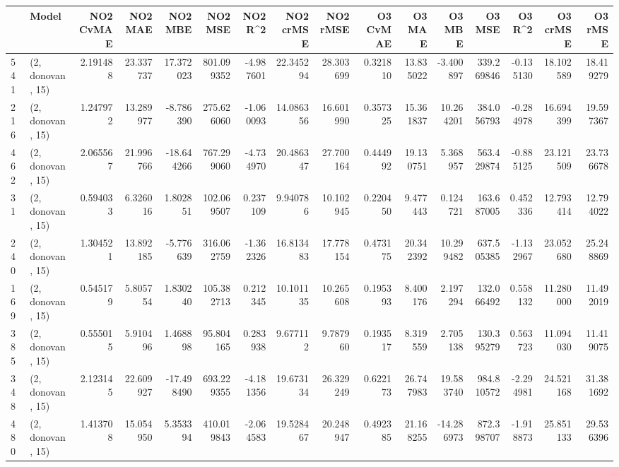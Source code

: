 \begin{tabular}{llrrrrrrrrrrrrrr}
\toprule
{} &             Model &  NO2 CvMAE &    NO2 MAE &    NO2 MBE &      NO2 MSE &    NO2 R\textasciicircum2 &  NO2 crMSE &   NO2 rMSE &  O3 CvMAE &     O3 MAE &     O3 MBE &        O3 MSE &     O3 R\textasciicircum2 &   O3 crMSE &     O3 rMSE \\
\midrule
541 &  (2, donovan, 15) &   2.191488 &  23.337737 &  17.372023 &   801.099352 &  -4.987601 &  22.345294 &  28.303699 &  0.321810 &  13.835022 &  -3.400897 &    339.269846 &  -0.135130 &  18.102589 &   18.419279 \\
216 &  (2, donovan, 15) &   1.247972 &  13.289977 &  -8.786390 &   275.626060 &  -1.060093 &  14.086356 &  16.601990 &  0.357325 &  15.361837 &  10.264201 &    384.056793 &  -0.284978 &  16.694399 &   19.597367 \\
462 &  (2, donovan, 15) &   2.065567 &  21.996766 & -18.644266 &   767.299060 &  -4.734970 &  20.486347 &  27.700164 &  0.444992 &  19.130751 &   5.368957 &    563.429874 &  -0.885125 &  23.121509 &   23.736678 \\
31  &  (2, donovan, 15) &   0.594033 &   6.326016 &   1.802851 &   102.069507 &   0.237109 &   9.940786 &  10.102945 &  0.220450 &   9.477443 &   0.124721 &    163.687005 &   0.452336 &  12.793414 &   12.794022 \\
240 &  (2, donovan, 15) &   1.304521 &  13.892185 &  -5.776639 &   316.062759 &  -1.362326 &  16.813483 &  17.778154 &  0.473175 &  20.342392 &  10.299482 &    637.505385 &  -1.132967 &  23.052680 &   25.248869 \\
169 &  (2, donovan, 15) &   0.545179 &   5.805754 &   1.830240 &   105.382713 &   0.212345 &  10.101135 &  10.265608 &  0.195393 &   8.400176 &   2.197294 &    132.066492 &   0.558132 &  11.280000 &   11.492019 \\
385 &  (2, donovan, 15) &   0.555015 &   5.910496 &   1.468898 &    95.804165 &   0.283938 &   9.677112 &   9.787960 &  0.193517 &   8.319559 &   2.705138 &    130.395279 &   0.563723 &  11.094030 &   11.419075 \\
348 &  (2, donovan, 15) &   2.123145 &  22.609927 & -17.498490 &   693.229355 &  -4.181356 &  19.673134 &  26.329249 &  0.622173 &  26.747983 &  19.583740 &    984.810572 &  -2.294981 &  24.521168 &   31.381692 \\
480 &  (2, donovan, 15) &   1.413708 &  15.054950 &   5.353394 &   410.019843 &  -2.064583 &  19.528467 &  20.248947 &  0.492385 &  21.168255 & -14.286973 &    872.398707 &  -1.918873 &  25.851133 &   29.536396 \\

\end{tabular}
